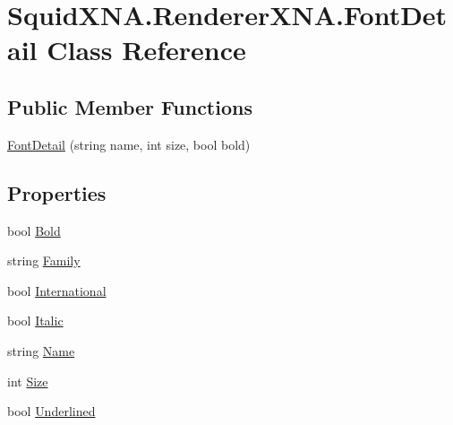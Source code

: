 \hypertarget{class_squid_x_n_a_1_1_renderer_x_n_a_1_1_font_detail}{\section{Squid\+X\+N\+A.\+Renderer\+X\+N\+A.\+Font\+Detail Class Reference}
\label{class_squid_x_n_a_1_1_renderer_x_n_a_1_1_font_detail}
}
\subsection*{Public Member Functions}
\begin{DoxyCompactItemize}
\item 
\hyperlink{class_squid_x_n_a_1_1_renderer_x_n_a_1_1_font_detail_a83d5d1e7ba963892c53d1898bddfd4c8}{Font\+Detail} (string name, int size, bool bold)
\end{DoxyCompactItemize}
\subsection*{Properties}
\begin{DoxyCompactItemize}
\item 
bool \hyperlink{class_squid_x_n_a_1_1_renderer_x_n_a_1_1_font_detail_aaa4ee7efa98c69041a500077bbf208de}{Bold}
\item 
string \hyperlink{class_squid_x_n_a_1_1_renderer_x_n_a_1_1_font_detail_a4a5901549be05519bfa62625e8d7e0a4}{Family}
\item 
bool \hyperlink{class_squid_x_n_a_1_1_renderer_x_n_a_1_1_font_detail_a334a33789d4c9a4ec1df2b4705f08e41}{International}
\item 
bool \hyperlink{class_squid_x_n_a_1_1_renderer_x_n_a_1_1_font_detail_ab09599c42bd515662d2dcbaef600b4be}{Italic}
\item 
string \hyperlink{class_squid_x_n_a_1_1_renderer_x_n_a_1_1_font_detail_a380d650cd3f2d4600b6d44b06798c6c3}{Name}
\item 
int \hyperlink{class_squid_x_n_a_1_1_renderer_x_n_a_1_1_font_detail_a39609cd3c59d631096aef512d39afb61}{Size}
\item 
bool \hyperlink{class_squid_x_n_a_1_1_renderer_x_n_a_1_1_font_detail_a6eb6a3f90ca4cbc408364101df6d0bc4}{Underlined}
\end{DoxyCompactItemize}



